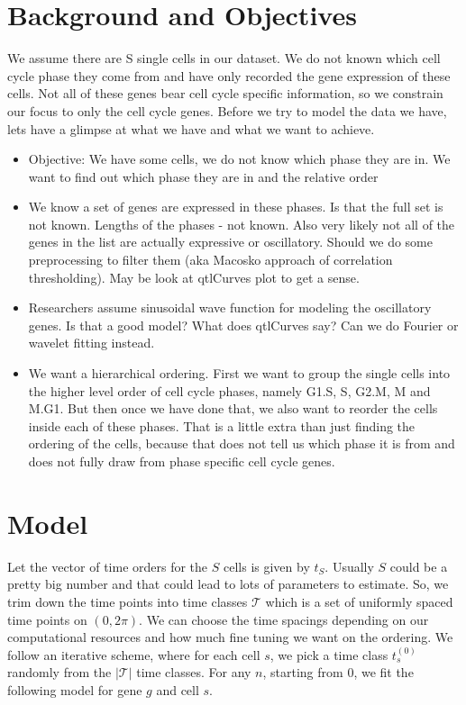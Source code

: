 \documentclass[11pt]{article}
\begin{document}
\section{Background and Objectives}

We assume there are S single cells in our dataset. We do not known which cell cycle phase they come from and have only recorded the gene expression of these cells. Not all of these genes bear cell cycle specific information, so we constrain our focus to only the cell cycle genes. Before we try to model the data we have, lets have a glimpse at what we have and what we want to achieve.

\begin{itemize}

\item  Objective: We have some cells, we do not know which phase they are in. We want to find out which phase they are in and the relative order 

\item We know a set of genes are expressed in these phases. Is that the full set is not known. Lengths of the phases - not known. Also very likely not all of the genes in the list are actually expressive or oscillatory. Should we do some preprocessing to filter them (aka Macosko approach of correlation thresholding). May be look at qtlCurves plot to get a sense. 

\item Researchers assume sinusoidal wave function for modeling the oscillatory genes. Is that a good model? What does qtlCurves say?
Can we do Fourier or wavelet fitting instead.

\item We want a hierarchical ordering. First we want to group the single cells into the  higher level order of cell cycle phases, namely G1.S, S, G2.M, M and M.G1. But then once we have done that, we also want to reorder the cells inside each of these phases. That is a little extra than just  finding the ordering of the cells, because that does not tell us which phase it is from and does not fully draw from phase specific cell cycle genes.
 
\end{itemize}


\section{Model}

Let the vector of time orders for the $S$ cells is given by $t_{S}$. Usually $S$ could be a pretty big number and that could lead to lots of parameters to estimate. So, we trim down the time points into time classes $\mathcal{T}$ which is a set of uniformly spaced time points on $(0, 2 \pi)$. We can choose the time spacings depending on our computational resources and how much fine tuning we want on the ordering. We follow an iterative scheme, where for each cell $s$, we pick a time class $t^{(0)}_{s}$ randomly from the $ | \mathcal{T} |$ time classes. For any $n$, starting from $0$, we fit the following model for gene $g$ and cell $s$.
\end{document}
